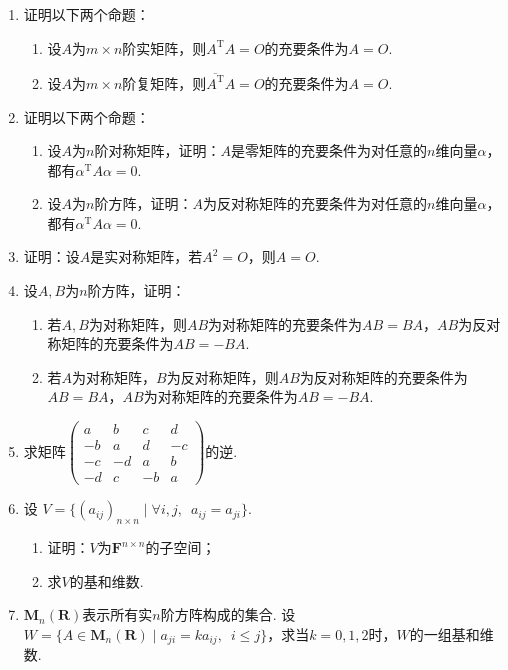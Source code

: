 \begin{enumerate}
    \item 证明以下两个命题：
          \begin{enumerate}
              \item 设$A$为$m\times n$阶实矩阵，则$A^\mathrm{T}A=O$的充要条件为$A=O$.
              \item 设$A$为$m\times n$阶复矩阵，则$\overline{A^\mathrm{T}}A=O$的充要条件为$A=O$.
          \end{enumerate}

    \item 证明以下两个命题：
          \begin{enumerate}
              \item 设$A$为$n$阶对称矩阵，证明：$A$是零矩阵的充要条件为对任意的$n$维向量$\alpha$，都有$\alpha^\mathrm{T}A\alpha=0$.
              \item 设$A$为$n$阶方阵，证明：$A$为反对称矩阵的充要条件为对任意的$n$维向量$\alpha$，都有$\alpha^\mathrm{T}A\alpha=0$.
          \end{enumerate}

    \item 证明：设$A$是实对称矩阵，若$A^2=O$，则$A=O$.

    \item 设$A,B$为$n$阶方阵，证明：
          \begin{enumerate}
              \item 若$A,B$为对称矩阵，则$AB$为对称矩阵的充要条件为$AB=BA$，$AB$为反对称矩阵的充要条件为$AB=-BA$.
              \item 若$A$为对称矩阵，$B$为反对称矩阵，则$AB$为反对称矩阵的充要条件为$AB=BA$，$AB$为对称矩阵的充要条件为$AB=-BA$.
          \end{enumerate}

    \item 求矩阵$\begin{pmatrix}
                  a  & b  & c  & d  \\
                  -b & a  & d  & -c \\
                  -c & -d & a  & b  \\
                  -d & c  & -b & a
              \end{pmatrix}$的逆.

    \item 设 $V=\{(a_{ij})_{n \times n} \mid \forall i,j,\enspace a_{ij}=a_{ji}\}$.
          \begin{enumerate}
              \item 证明：$V$为$\mathbf{F}^{n \times n}$的子空间；

              \item 求$V$的基和维数.
          \end{enumerate}

    \item $\mathbf{M}_n(\mathbf{R})$表示所有实$n$阶方阵构成的集合. 设$W=\{A\in \mathbf{M}_n(\mathbf{R}) \mid a_{ji}=ka_{ij},\enspace i \leqslant j\}$，求当$k=0,1,2$时，$W$的一组基和维数.
\end{enumerate}

